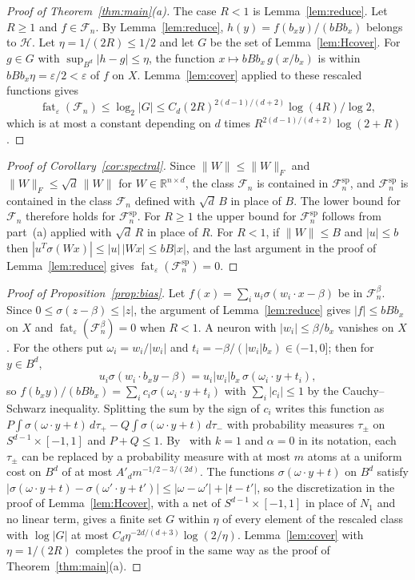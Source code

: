 \documentclass[11pt]{amsart}
\theoremstyle{definition}
\theoremstyle{remark}
\numberwithin{equation}{section}
\newcommand{\RR}{\mathbb{R}}
\newcommand{\cF}{\mathcal{F}}
\newcommand{\fat}{\operatorname{fat}}
\begin{document}
\begin{proof}[Proof of Theorem~\ref{thm:main}(a)]
The case $R<1$ is Lemma~\ref{lem:reduce}. Let $R\ge1$ and $f\in\cF_n$. By Lemma~\ref{lem:reduce}, $h(y)=f(b_xy)/(bBb_x)$ belongs to $\mathcal H$. Let $\eta=1/(2R)\le1/2$ and let $G$ be the set of Lemma~\ref{lem:Hcover}. For $g\in G$ with $\sup_{B^d}|h-g|\le\eta$, the function $x\mapsto bBb_x\,g(x/b_x)$ is within $bBb_x\eta=\varepsilon/2<\varepsilon$ of $f$ on $X$. Lemma~\ref{lem:cover} applied to these rescaled functions gives
\[
\fat_\varepsilon(\cF_n)\le\log_2|G|\le C_d(2R)^{2(d-1)/(d+2)}\log(4R)/\log2,
\]
which is at most a constant depending on $d$ times $R^{2(d-1)/(d+2)}\log(2+R)$.
\end{proof}

\begin{proof}[Proof of Corollary~\ref{cor:spectral}]
Since $\|W\|\le\|W\|_F$ and $\|W\|_F\le\sqrt d\,\|W\|$ for $W\in\RR^{n\times d}$, the class $\cF_n$ is contained in $\cF_n^{\mathrm{sp}}$, and $\cF_n^{\mathrm{sp}}$ is contained in the class $\cF_n$ defined with $\sqrt d\,B$ in place of $B$. The lower bound for $\cF_n$ therefore holds for $\cF_n^{\mathrm{sp}}$. For $R\ge1$ the upper bound for $\cF_n^{\mathrm{sp}}$ follows from part~(a) applied with $\sqrt d\,R$ in place of $R$. For $R<1$, if $\|W\|\le B$ and $|u|\le b$ then $|u^{T}\sigma(Wx)|\le|u|\,|Wx|\le bB|x|$, and the last argument in the proof of Lemma~\ref{lem:reduce} gives $\fat_\varepsilon(\cF_n^{\mathrm{sp}})=0$.
\end{proof}

\begin{proof}[Proof of Proposition~\ref{prop:bias}]
Let $f(x)=\sum_iu_i\sigma(w_i\cdot x-\beta)$ be in $\cF^\beta_n$. Since $0\le\sigma(z-\beta)\le|z|$, the argument of Lemma~\ref{lem:reduce} gives $|f|\le bBb_x$ on $X$ and $\fat_\varepsilon(\cF_n^\beta)=0$ when $R<1$. A neuron with $|w_i|\le\beta/b_x$ vanishes on $X$. For the others put $\omega_i=w_i/|w_i|$ and $t_i=-\beta/(|w_i|b_x)\in(-1,0]$; then for $y\in B^d$,
\[
u_i\sigma(w_i\cdot b_xy-\beta)=u_i|w_i|b_x\,\sigma(\omega_i\cdot y+t_i),
\]
so $f(b_xy)/(bBb_x)=\sum_ic_i\sigma(\omega_i\cdot y+t_i)$ with $\sum_i|c_i|\le1$ by the Cauchy--Schwarz inequality. Splitting the sum by the sign of $c_i$ writes this function as $P\int\sigma(\omega\cdot y+t)\,d\tau_+-Q\int\sigma(\omega\cdot y+t)\,d\tau_-$ with probability measures $\tau_\pm$ on $S^{d-1}\times[-1,1]$ and $P+Q\le1$. By~\cite[Theorem~2]{Siegel} with $k=1$ and $\alpha=0$ in its notation, each $\tau_\pm$ can be replaced by a probability measure with at most $m$ atoms at a uniform cost on $B^d$ of at most $A'_dm^{-1/2-3/(2d)}$. The functions $\sigma(\omega\cdot y+t)$ on $B^d$ satisfy $|\sigma(\omega\cdot y+t)-\sigma(\omega'\cdot y+t')|\le|\omega-\omega'|+|t-t'|$, so the discretization in the proof of Lemma~\ref{lem:Hcover}, with a net of $S^{d-1}\times[-1,1]$ in place of $N_1$ and no linear term, gives a finite set $G$ within $\eta$ of every element of the rescaled class with $\log|G|$ at most $C_d\eta^{-2d/(d+3)}\log(2/\eta)$. Lemma~\ref{lem:cover} with $\eta=1/(2R)$ completes the proof in the same way as the proof of Theorem~\ref{thm:main}(a).
\end{proof}
\end{document}

